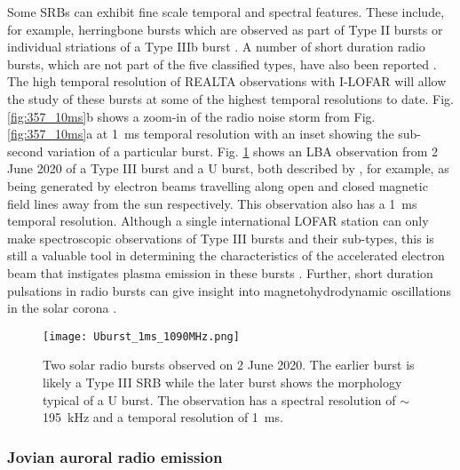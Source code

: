 Some SRBs can exhibit fine scale temporal and spectral features. These include, for example, herringbone bursts which are observed as part of Type II bursts \citep[for example,][]{Carley2015} or individual striations of a Type IIIb burst \citep[for example,][]{Zhang2020}. 
A number of short duration radio bursts, which are not part of the five classified types, have also been reported \citep[for example,][]{Ellis1967, Ellis1969, Melnik2010}. 
The high temporal resolution of REALTA observations with I-LOFAR will allow the study of these bursts at some of the highest temporal resolutions to date. Fig. \ref{fig:357_10ms}b shows a zoom-in of the radio noise storm from Fig. \ref{fig:357_10ms}a at 1~ms temporal resolution with an inset showing the sub-second variation of a particular burst. Fig. \ref{fig:uburst} shows an LBA observation from 2 June 2020 of a Type III burst and a U burst, both described by \cite{Reid2014}, for example, as being generated by electron beams travelling along open and closed magnetic field lines away from the sun respectively. This observation also has a 1~ms temporal resolution. Although a single international LOFAR station can only make spectroscopic observations of Type III bursts and their sub-types, this is still a valuable tool in determining the characteristics of the accelerated electron beam that instigates plasma emission in these bursts \citep{Reid2018}. Further, short duration pulsations in radio bursts can give insight into magnetohydrodynamic oscillations in the solar corona \citep{Carley2019}.

\begin{figure}
    \centering
    \texttt{[image: Uburst\_1ms\_1090MHz.png]}
    \caption[Two solar radio bursts observed on 2 June 2020.]{Two solar radio bursts observed on 2 June 2020. The earlier burst is likely a Type III SRB while the later burst shows the morphology typical of a U burst. The observation has a spectral resolution of $\sim$ \SI{195}{\kilo \hertz} and a temporal resolution of \SI{1}{\milli \second}.}
    \label{fig:uburst}
\end{figure}

\subsubsection{Jovian auroral radio emission}

